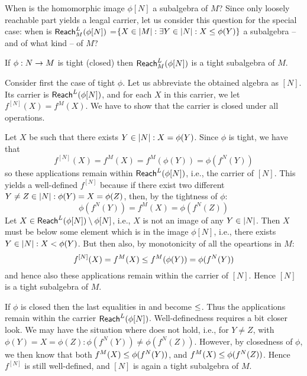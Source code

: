 When is the homomorphic image $\phi[N]$ a subalgebra of $M$? Since
only loosely reachable part yields a leagal carrier, let us consider
this question for the special case: when is $\reach L{\phi[N]}M$
=$\{X\in\Card M : \exists Y\in\Card N:X\po\phi(Y)\}$ a subalgebra --
and of what kind -- of $M$?

\begin{Fact}\label{fa:TCsub}
If $\phi:N\into M$ is tight (closed) then $\reach L{\phi[N]}{M}$
is a tight subalgebra of $M$.
\end{Fact}

\begin{Proof}
Consider first the case of tight $\phi$.  Let us abbreviate the
obtained algebra as $[N]$. Its carrier is $\reach L{\phi[N]}{}$, and
for each $X$ in this carrier, we let $f^{[N]}(X) = f^M(X)$. We have to
show that the carrier is closed under all operations.

Let $X$ be such that there exists $Y\in\Card N:X = \phi(Y)$.  Since
$\phi$ is tight, we have that 
\begin{equation}\label{eq:isin}
f^{[N]}(X) = f^M(X) = f^M(\phi(Y))
= \phi(f^N(Y))
\end{equation}
so these applications remain within $\reach L{\phi[N]}{}$, i.e., the
carrier of $[N]$.  This yields a well-defined $f^{[N]}$ because
if there exist two different $Y\not=Z\in\Card N: \phi(Y)=X=\phi(Z)$,
then, by the tightness of $\phi:$
\begin{equation}\label{eq:well}
 \phi(f^N(Y))=f^M(X)=\phi(f^N(Z))
\end{equation}
%
Let $X\in\reach L{\phi[N]}{}\setminus\phi[N]$, i.e.,  $X$ is not an image of any
$Y\in\Card N$. Then $X$ must be below some element which is in the
image  $\phi[N]$, i.e., there exists $Y\in\Card N:
X\spo\phi(Y)$. But then also, by monotonicity of all the opeartions in
$M:$
\begin{equation}\label{eq:notin}
 f^{[N]}(X)=f^M(X)\po f^M(\phi(Y))=\phi(f^N(Y))
\end{equation}
and hence
also these applications remain within the carrier of $[N]$. Hence
$[N]$ is a tight subalgebra of $M$.

If $\phi$ is closed then the last equalities in  and
 become $\po$. Thus the applications remain within the
carrier $\reach L{\phi[N]}{}$. Well-definedness requires a bit closer
look.  We may have the situation where  does not hold,
i.e., for $Y\not= Z$, with $\phi(Y)=X=\phi(Z):
\phi(f^N(Y))\not=\phi(f^N(Z))$.  However, by closedness of $\phi$, we
then know that both $f^M(X)\po\phi(f^N(Y))$, and
$f^M(X)\po\phi(f^N(Z))$. Hence $f^{[N]}$ is still well-defined,
and $[N]$ is again a tight subalgebra of $M$.
%
\end{Proof}

